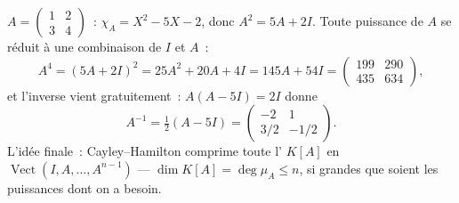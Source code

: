 \begin{example}\label{ex:b2:reduction:chwork}
$A = \begin{pmatrix} 1 & 2\\ 3 & 4\end{pmatrix}$~: $\chi_A = X^2 -
5X - 2$, donc $A^2 = 5A + 2I$. Toute puissance de $A$ se réduit à une
combinaison de $I$ et $A$~:
\[
A^4 = (5A + 2I)^2 = 25A^2 + 20A + 4I = 145A + 54I =
\begin{pmatrix} 199 & 290\\ 435 & 634\end{pmatrix},
\]
et l'inverse vient gratuitement~: $A(A - 5I) = 2I$ donne
\[
A^{-1} = \tfrac12(A - 5I)
= \begin{pmatrix} -2 & 1\\ 3/2 & -1/2\end{pmatrix}.
\]
L'idée finale~: Cayley--Hamilton comprime toute l' $K[A]$ en
$\operatorname{Vect}(I, A, \dots, A^{n-1})$ --- $\dim K[A] = \deg\mu_A
\leq n$, si grandes que soient les puissances dont on a besoin.
\end{example}

